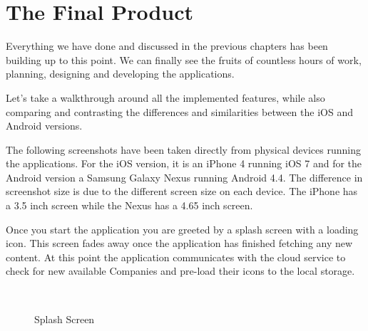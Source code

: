 \chapter{The Final Product}\label{ch:final}

Everything we have done and discussed in the previous chapters has been building up to this point. We can finally see the fruits of countless hours of work, planning, designing and developing the applications.

Let's take a walkthrough around all the implemented features, while also comparing and contrasting the differences and similarities between the iOS and Android versions.

The following screenshots have been taken directly from physical devices running the applications. For the iOS version, it is an iPhone 4 running iOS 7 and for the Android version a Samsung Galaxy Nexus running Android 4.4. The difference in screenshot size is due to the different screen size on each device. The iPhone has a 3.5 inch screen while the Nexus has a 4.65 inch screen.

Once you start the application you are greeted by a splash screen with a loading icon. This screen fades away once the application has finished fetching any new content. At this point the application communicates with the cloud service to check for new available Companies and pre-load their icons to the local storage.

\begin{figure}[H]
        \myfloatalign
         \quad
         \\
        \caption[Splash Screen]{Splash Screen}
\end{figure}
\newpage

